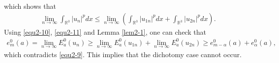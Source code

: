\documentclass[reqno, 11pt]{amsart} %
\numberwithin{equation}{section}
\begin{document}
	which shows that
	\begin{equation}\label{equ2-11}
		\begin{split}
			\lim_{n\rightarrow\infty}\int_{\mathbb{R}^{3}}\left| u_{n}\right| ^{p}dx\leq\lim_{n\rightarrow\infty}\left(\int_{\mathbb{R}^{3}}\left| u_{1n}\right| ^{p}dx+\int_{\mathbb{R}^{3}}\left| u_{2n}\right| ^{p}dx \right).
		\end{split}
	\end{equation}
	Using \eqref{equ2-10}, \eqref{equ2-11} and Lemma \ref{lem2-1}, one can check that
	\begin{equation*}
		\begin{split}
			e^{0}_{m}(a)=\lim _{n\rightarrow\infty}E^{0}_{a}(u_{n})\geq\lim _{n\rightarrow\infty}E^{0}_{a}(u_{1n})+\lim _{n\rightarrow\infty}E^{0}_{a}(u_{2n})\geq e^{0}_{m-\alpha}(a)+e^{0}_{\alpha}(a),
		\end{split}
	\end{equation*}
	which contradicts \eqref{equ2-9}. This  implies that the dichotomy case cannot occur.
	
\end{document}
